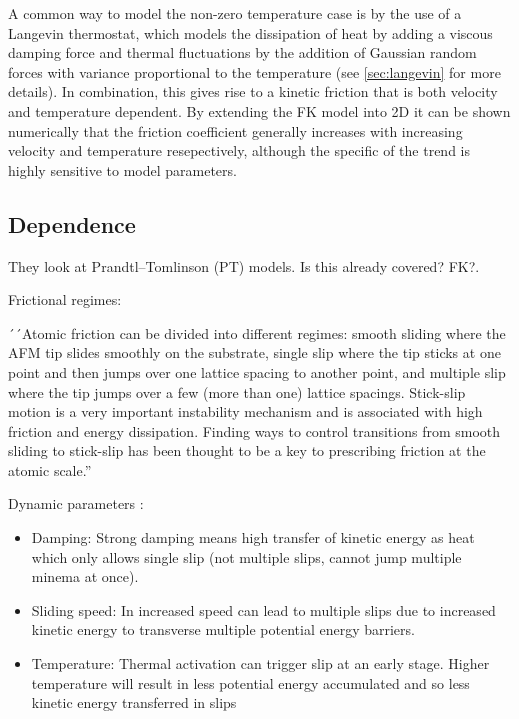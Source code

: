 
A common way to model the non-zero temperature case is by the use of a Langevin
thermostat, which models the dissipation of heat by adding a viscous damping
force and thermal fluctuations by the addition of Gaussian random forces with
variance proportional to the temperature (see \cref{sec:langevin} for more details). In combination, this gives rise to a kinetic
friction that is both velocity and temperature dependent. By extending the \acrshort{FK} model into 2D \cite{FK2D} it can be shown numerically that
the friction coefficient generally increases with increasing velocity and
temperature resepectively, although the specific of the trend is highly
sensitive to model parameters. 


\subsection{Dependence}

They look at Prandtl–Tomlinson (PT) models. Is this already covered? \acrshort{FK}?.



Frictional regimes: 

´´Atomic friction can be divided into different regimes: smooth sliding where the AFM tip slides smoothly on the substrate, single slip where the tip sticks at one point and then jumps over one lattice spacing to another point, and multiple slip where the tip jumps over a few (more than one) lattice spacings. Stick-slip motion is a very important instability mechanism and is associated with high friction and energy dissipation. Finding ways to control transitions from smooth sliding to stick-slip has been thought to be a key to prescribing friction at the atomic scale.'' \cite{Yalin_2011}


Dynamic parameters \cite{Yalin_2011}:
\begin{itemize}
  \item Damping: Strong damping means high transfer of kinetic energy as heat which only allows single slip (not multiple slips, cannot jump multiple minema at once).
  \item Sliding speed: In increased speed can lead to multiple slips due to increased kinetic energy to transverse multiple potential energy barriers. 
  \item Temperature: Thermal activation can trigger slip at an early stage. Higher temperature will result in less potential energy accumulated and so less kinetic energy transferred in slips
\end{itemize}



